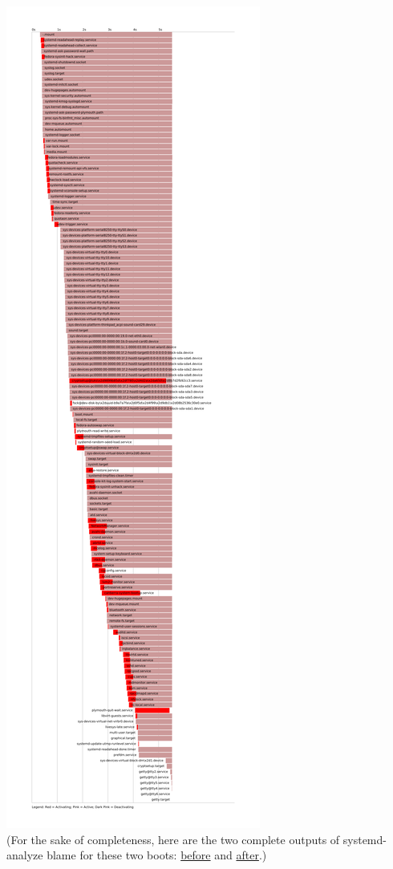 \documentclass[titlepage]{article}
\begin{document}
\includegraphics[scale=0.1]{blame2.png}
\\
(For the sake of completeness, here are the two complete outputs of systemd-analyze blame for these two boots: \href{https://0pointer.de/public/blame.txt}{before} and \href{https://0pointer.de/public/blame2.txt}{after}.)
\end{document}
